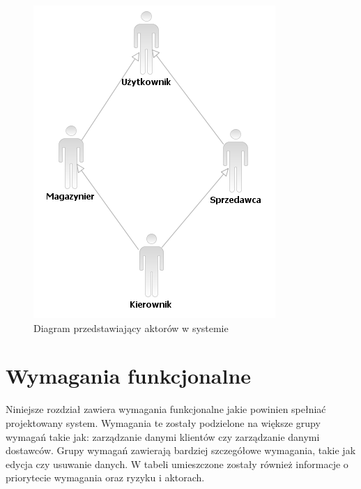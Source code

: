 \begin{figure}[h]
    \begin{center}
    \includegraphics[scale=0.75]{../img/diagramDziedziczenia.png}
    \end{center}
    \label{fig:diagramDziedziczenia}
    \caption{Diagram przedstawiający aktorów w systemie}
\end{figure}
\FloatBarrier

\section{Wymagania funkcjonalne}

Niniejsze rozdział zawiera wymagania funkcjonalne jakie powinien spełniać
projektowany system. Wymagania te zostały podzielone na większe grupy wymagań
takie jak: zarządzanie danymi klientów czy zarządzanie danymi dostawców. 
Grupy wymagań zawierają bardziej szczegółowe wymagania, takie jak edycja czy
usuwanie danych. W tabeli umieszczone zostały również informacje o priorytecie
wymagania oraz ryzyku i aktorach.


